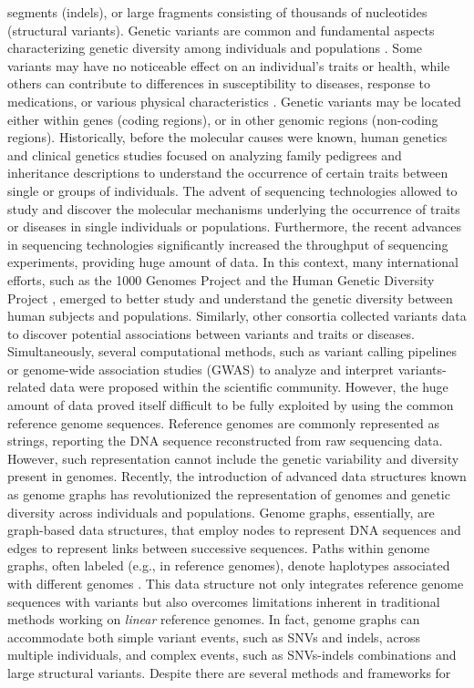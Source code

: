 \documentclass[a4paper, titlepage, openright]{book}
\begin{document}
segments (indels), or large fragments consisting of thousands of nucleotides (structural variants). Genetic variants are common and fundamental aspects characterizing genetic diversity among individuals and populations \citep{siva20081000}. Some variants may have no noticeable effect on an individual's traits or health, while others can contribute to differences in susceptibility to diseases, response to medications, or various physical characteristics \citep{bodmer2008common, ingelman2018integrating, mitchell2007evolutionary}. Genetic variants may be located either within genes (coding regions), or in other genomic regions (non-coding regions). Historically, before the molecular causes were known, human genetics and clinical genetics studies focused on analyzing family pedigrees and inheritance descriptions to understand the occurrence of certain traits between single or groups of individuals. The advent of sequencing technologies allowed to study and discover the molecular mechanisms underlying the occurrence of traits or diseases in single individuals or populations. Furthermore, the recent advances in sequencing technologies significantly increased the throughput of sequencing experiments, providing huge amount of data. In this context, many international efforts, such as the 1000 Genomes Project \citep{siva20081000, 10002015global} and the Human Genetic Diversity Project \citep{cavalli2005human, bergstrom2020insights}, emerged to better study and understand the genetic diversity between human subjects and populations. Similarly, other consortia \citep{sherry2001dbsnp, landrum2020clinvar} collected variants data to discover potential associations between variants and traits or diseases. Simultaneously, several computational methods, such as variant calling \citep{mckenna2010genome} pipelines or genome-wide association studies (GWAS) \citep{uffelmann2021genome} to analyze and interpret variants-related data were proposed within the scientific community. However, the huge amount of data proved itself difficult to be fully exploited by using the common reference genome sequences. Reference genomes are commonly represented as strings, reporting the DNA sequence reconstructed from raw sequencing data. However, such representation cannot include the genetic variability and diversity present in genomes. Recently, the introduction of advanced data structures known as genome graphs \citep{paten2017genome,garrison2018variation} has revolutionized the representation of genomes and genetic diversity across individuals and populations. Genome graphs, essentially, are graph-based data structures, that employ nodes to represent DNA sequences and edges to represent links between successive sequences. Paths within genome graphs, often labeled (e.g., in reference genomes), denote haplotypes associated with different genomes \citep{siren2020haplotype}. This data structure not only integrates reference genome sequences with variants but also overcomes limitations inherent in traditional methods working on \emph{linear} reference genomes. In fact, genome graphs can accommodate both simple variant events, such as SNVs and indels, across multiple individuals, and complex events, such as SNVs-indels combinations and large structural variants. Despite there are several methods and frameworks for 
\end{document}

